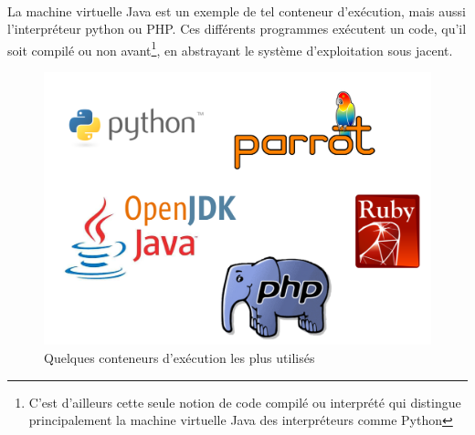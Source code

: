 {  \paragraph{} La machine virtuelle Java est un exemple de tel conteneur d'exécution, mais aussi
  l'interpréteur python ou PHP. Ces différents programmes exécutent un code, qu'il soit compilé ou non
  avant\footnote{C'est d'ailleurs cette seule notion de code compilé ou interprété qui distingue
  principalement la machine virtuelle Java des interpréteurs comme Python}, en abstrayant le système
  d'exploitation sous jacent.

  \begin{figure}[hb]
    \begin{center}
      \includegraphics[scale=0.3]{img/sample-containers.png}
      \caption{Quelques conteneurs d'exécution les plus utilisés}
      \label{sample-containers}
    \end{center}
  \end{figure}
}



